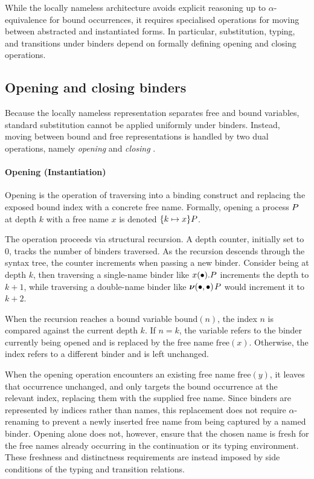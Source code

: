 While the locally nameless architecture avoids explicit reasoning up to $\alpha$-equivalence for bound occurrences, it requires specialised operations for moving between abstracted and instantiated forms. In particular, substitution, typing, and transitions under binders depend on formally defining opening and closing operations.

\subsection{Opening and closing binders}\label{subsec:opening-and-closing} %
Because the locally nameless representation separates free and bound variables, standard substitution cannot be applied uniformly under binders. Instead, moving between bound and free representations is handled by two dual operations, namely \emph{opening} and \emph{closing} \citep{C12}.

\paragraph{Opening (Instantiation)} 
Opening is the operation of traversing into a binding construct and replacing the exposed bound index with a concrete free name. Formally, opening a process {$P$} at depth $k$ with a free name $x$ is denoted {$\{k \mapsto x\}P$}.

The operation proceeds via structural recursion. A depth counter, initially set to $0$, tracks the number of binders traversed. As the recursion descends through the syntax tree, the counter increments when passing a new binder. Consider being at depth $k$, then traversing a single-name binder like {${{x(\bullet)}{.}P}$} increments the depth to $k+1$, while traversing a double-name binder like {${\boldsymbol{\nu}{(\bullet,\bullet)}\mspace{2mu}}{P}$} would increment it to $k+2$. 

When the recursion reaches a bound variable $\text{bound}(n)$, the index $n$ is compared against the current depth $k$. If $n = k$, the variable refers to the binder currently being opened and is replaced by the free name $\text{free}(x)$. Otherwise, the index refers to a different binder and is left unchanged.

When the opening operation encounters an existing free name ${\text{free}(y)}$, it leaves that occurrence unchanged, and only targets the bound occurrence at the relevant index, replacing them with the supplied free name. Since binders are represented by indices rather than names, this replacement does not require $\alpha$-renaming to prevent a newly inserted free name from being captured by a named binder. Opening alone does not, however, ensure that the chosen name is fresh for the free names already occurring in the continuation or its typing environment. These freshness and distinctness requirements are instead imposed by side conditions of the typing and transition relations.

